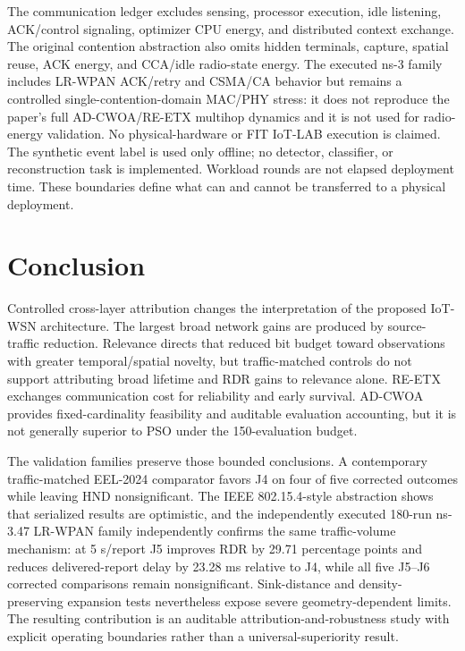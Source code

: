 \documentclass[pdflatex,sn-mathphys-num]{sn-jnl}
\begin{document}
The communication ledger excludes sensing, processor execution, idle listening, ACK/control signaling, optimizer CPU energy, and distributed context exchange. The original contention abstraction also omits hidden terminals, capture, spatial reuse, ACK energy, and CCA/idle radio-state energy. The executed ns-3 family includes LR-WPAN ACK/retry and CSMA/CA behavior but remains a controlled single-contention-domain MAC/PHY stress: it does not reproduce the paper's full AD-CWOA/RE-ETX multihop dynamics and it is not used for radio-energy validation. No physical-hardware or FIT IoT-LAB execution is claimed. The synthetic event label is used only offline; no detector, classifier, or reconstruction task is implemented. Workload rounds are not elapsed deployment time. These boundaries define what can and cannot be transferred to a physical deployment.

\section{Conclusion}

Controlled cross-layer attribution changes the interpretation of the proposed IoT-WSN architecture. The largest broad network gains are produced by source-traffic reduction. Relevance directs that reduced bit budget toward observations with greater temporal/spatial novelty, but traffic-matched controls do not support attributing broad lifetime and RDR gains to relevance alone. RE-ETX exchanges communication cost for reliability and early survival. AD-CWOA provides fixed-cardinality feasibility and auditable evaluation accounting, but it is not generally superior to PSO under the 150-evaluation budget.

The validation families preserve those bounded conclusions. A contemporary traffic-matched EEL-2024 comparator favors J4 on four of five corrected outcomes while leaving HND nonsignificant. The IEEE 802.15.4-style abstraction shows that serialized results are optimistic, and the independently executed 180-run ns-3.47 LR-WPAN family independently confirms the same traffic-volume mechanism: at 5 s/report J5 improves RDR by 29.71 percentage points and reduces delivered-report delay by 23.28 ms relative to J4, while all five J5--J6 corrected comparisons remain nonsignificant. Sink-distance and density-preserving expansion tests nevertheless expose severe geometry-dependent limits. The resulting contribution is an auditable attribution-and-robustness study with explicit operating boundaries rather than a universal-superiority result.
\end{document}
